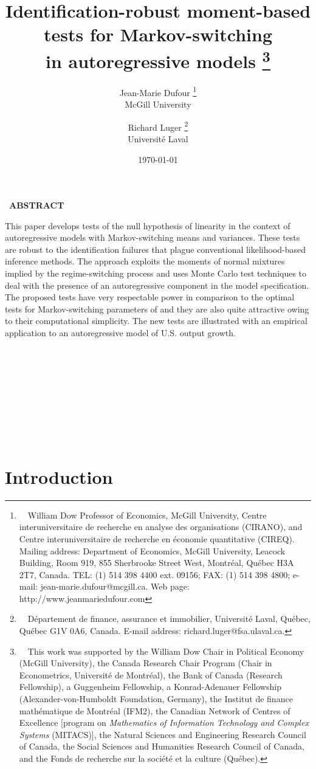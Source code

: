 \documentclass[11pt]{article}
\makeatletter
\newcommand{\standardthanksIFM}{This work was supported by the William Dow Chair in Political Economy (McGill University), the Canada Research Chair Program (Chair in Econometrics, Universit\'{e} de Montr\'{e}al), the Bank of Canada (Research Fellowship), a Guggenheim  Fellowship, a Konrad-Adenauer  Fellowship (Alexander-von-Humboldt Foundation, Germany), the Institut de finance math\'{e}matique de Montr\'{e}al (IFM2), the Canadian Network of Centres of Excellence [program on \emph{Mathematics of Information Technology and Complex Systems} (MITACS)], the Natural Sciences and Engineering Research Council of Canada, the Social Sciences and Humanities Research Council of Canada, and the Fonds de recherche sur la soci\'{e}t\'{e} et la culture (Qu\'{e}bec).}
\newcommand{\DufourAddress}{William Dow Professor of Economics, McGill University,
  Centre interuniversitaire de recherche en analyse des organisations (CIRANO), and Centre interuniversitaire de recherche en   \'{e}conomie quantitative (CIREQ).
  Mailing address:  Department of Economics, McGill University, Leacock Building, Room 919,  855 Sherbrooke Street West, Montr\'{e}al, Qu\'{e}bec H3A 2T7, Canada.
  TEL: (1) 514 398 4400 ext. 09156; FAX: (1) 514 398 4800; e-mail: jean-marie.dufour@mcgill.ca. Web page:  http://www.jeanmariedufour.com}
\newcommand{\LugerAddress}{D\'{e}partement de finance, assurance et immobilier, Universit\'{e} Laval, Qu\'{e}bec, Qu\'{e}bec G1V 0A6, Canada. E-mail address: richard.luger@fsa.ulaval.ca.}
\providecommand{\vartitleadjust}{}
\renewcommand{\vartitleadjust}{}
\providecommand{\varthanks}{\standardthanksIFM}
\renewcommand{\varthanks}{\standardthanksIFM}
\providecommand{\thanksvar}{\thanks{\varthanks}}
\renewcommand{\thanksvar}{\thinspace \thanks{\ \ \varthanks}}
\providecommand{\vartitle}{\vartitleadjust Identification-robust moment-based tests for Markov-switching \\
in autoregressive models}
\renewcommand{\vartitle}{\vartitleadjust Identification-robust moment-based tests for Markov-switching \\
in autoregressive models}
\providecommand{\varAuthors}{Jean-Marie Dufour \thanks{\ \ \DufourAddress} \\
 McGill University \and 
 Richard Luger \thanks{\ \ \LugerAddress} \\ 
 Universit\'e Laval}
\renewcommand{\varAuthors}{Jean-Marie Dufour \thanks{\ \ \DufourAddress} \\
 McGill University \and 
 Richard Luger \thanks{\ \ \LugerAddress} \\ 
 Universit\'e Laval}
\providecommand{\vardate}{\today, \texttime}
\renewcommand{\vardate}{\today}
\makeatother
\begin{document}
\title{\vartitle
\thanksvar }
\author{\varAuthors}
\date{\vardate}
\maketitle

\thispagestyle{empty}

\renewcommand{\baselinestretch}{1.55}

\newpage \thispagestyle{empty}

\begin{center}
{\ \textbf{ABSTRACT} }

\quad
\end{center}

\noindent

This paper develops tests of the null hypothesis of linearity in the context
of autoregressive models with Markov-switching means and variances. These
tests are robust to the identification failures that plague conventional
likelihood-based inference methods. The approach exploits the moments of
normal mixtures implied by the regime-switching process and uses Monte Carlo
test techniques to deal with the presence of an autoregressive component in
the model specification. The proposed tests have very respectable power in
comparison to the optimal tests for Markov-switching parameters of %
\citet{Carrasco-Hu-Ploberger:2014} and they are also quite attractive owing
to their computational simplicity. The new tests are illustrated with an
empirical application to an autoregressive model of U.S. output growth.

{\ \bigskip }


{\ \bigskip }


{\ \newpage }

{\ \setcounter{page}{1} }

{\ \renewcommand{\thefootnote}{\arabic{footnote}} \setcounter{footnote}{0} }

\section{Introduction}
\end{document}
